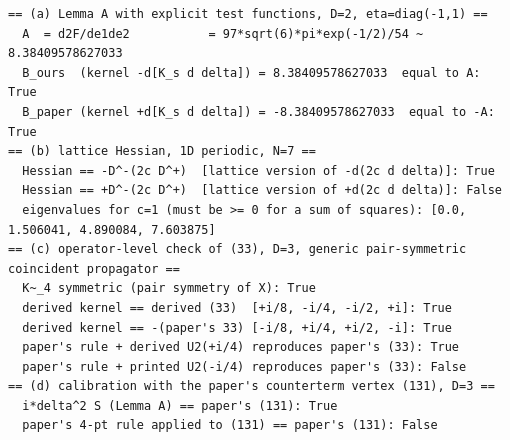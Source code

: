 \begin{verbatim}
== (a) Lemma A with explicit test functions, D=2, eta=diag(-1,1) ==
  A  = d2F/de1de2           = 97*sqrt(6)*pi*exp(-1/2)/54 ~ 8.38409578627033
  B_ours  (kernel -d[K_s d delta]) = 8.38409578627033  equal to A: True
  B_paper (kernel +d[K_s d delta]) = -8.38409578627033  equal to -A: True
== (b) lattice Hessian, 1D periodic, N=7 ==
  Hessian == -D^-(2c D^+)  [lattice version of -d(2c d delta)]: True
  Hessian == +D^-(2c D^+)  [lattice version of +d(2c d delta)]: False
  eigenvalues for c=1 (must be >= 0 for a sum of squares): [0.0, 1.506041, 4.890084, 7.603875]
== (c) operator-level check of (33), D=3, generic pair-symmetric coincident propagator ==
  K~_4 symmetric (pair symmetry of X): True
  derived kernel == derived (33)  [+i/8, -i/4, -i/2, +i]: True
  derived kernel == -(paper's 33) [-i/8, +i/4, +i/2, -i]: True
  paper's rule + derived U2(+i/4) reproduces paper's (33): True
  paper's rule + printed U2(-i/4) reproduces paper's (33): False
== (d) calibration with the paper's counterterm vertex (131), D=3 ==
  i*delta^2 S (Lemma A) == paper's (131): True
  paper's 4-pt rule applied to (131) == paper's (131): False
\end{verbatim}
\endgroup

